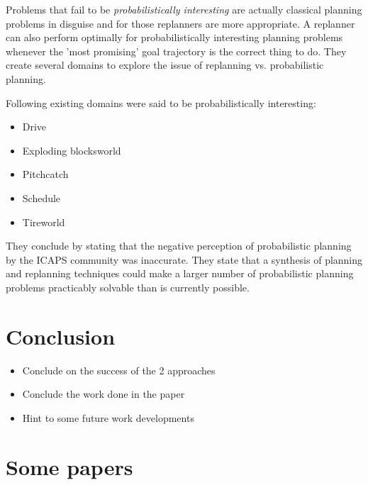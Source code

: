 \documentclass[runningheads,a4paper]{llncs}
\begin{document}
Problems that fail to be \emph{probabilistically interesting} are actually classical planning problems in disguise and for those replanners are more appropriate. A replanner can also perform optimally for probabilistically interesting planning problems whenever the 'most promising' goal trajectory is the correct thing to do. They create several domains to explore the issue of replanning vs. probabilistic planning.

Following existing domains were said to be probabilistically interesting:
\begin{itemize}
	\item Drive
	\item Exploding blocksworld
	\item Pitchcatch
	\item Schedule
	\item Tireworld
\end{itemize}

They conclude by stating that the negative perception of probabilistic planning by the ICAPS community was inaccurate. They state that a synthesis of planning and replanning techniques could make a larger number of probabilistic planning problems practicably solvable than is currently possible.





\section{Conclusion}

\begin{itemize}
	\item Conclude on the success of the 2 approaches
	\item Conclude the work done in the paper
	\item Hint to some future work developments
\end{itemize}

\section{Some papers}
\end{document}
